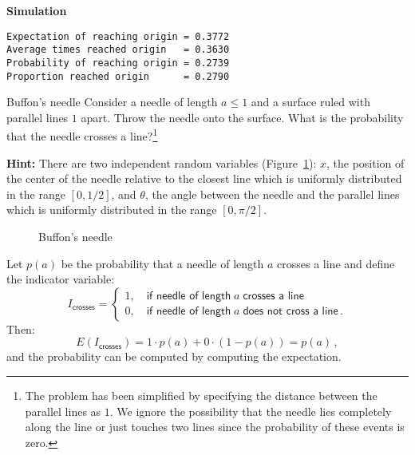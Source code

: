 \textbf{Simulation}
\begin{verbatim}
Expectation of reaching origin = 0.3772
Average times reached origin   = 0.3630
Probability of reaching origin = 0.2739
Proportion reached origin      = 0.2790
\end{verbatim}


\begin{prob}{Buffon's needle}
Consider a needle of length $a\leq 1$ and a surface ruled with parallel lines $1$ apart. Throw the needle onto the surface. What is the probability that the needle crosses a line?\footnote{The problem has been simplified by specifying the distance between the parallel lines as $1$. We ignore the possibility that the needle lies completely along the line or just touches two lines since the probability of these events is zero.}

\textbf{Hint:} There are two independent random variables (Figure~\ref{f.buffon1}): $x$, the position of the center of the needle relative to the closest line which is uniformly distributed in the range $[0,1/2]$, and $\theta$, the angle between the needle and the parallel lines which is uniformly distributed in the range $[0,\pi/2]$.

\begin{figure}[tb]
\begin{center}
\end{center}
\caption{Buffon's needle}\label{f.buffon1}
\end{figure}
\end{prob}


Let $p(a)$ be the probability that a needle of length $a$ crosses a line and define the indicator variable:
\[
I_{\textsf{crosses}}=
\left\{
\begin{array}{ll}
1,\quad \textsf{if needle of length}\;a\;\textsf{crosses a line}\\
0, \quad \textsf{if needle of length}\;a\;\textsf{does not cross a line}\,.
\end{array}
\right.
\]
Then:
\begin{equation}\label{eq.buffon-probability}
E(I_{\textsf{crosses}})=1\cdot p(a) + 0\cdot (1-p(a))=p(a)\,,
\end{equation}
and the probability can be computed by computing the expectation.

